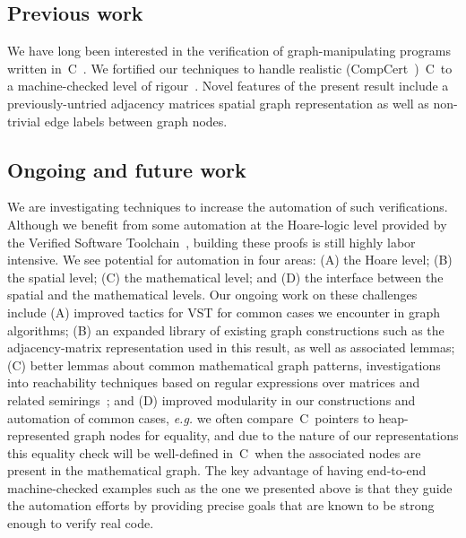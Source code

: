 \subsection{Previous work} We have long been interested in
the verification of graph-manipulating programs written in~C~\cite{hobor:ramification}.
We fortified our techniques to handle realistic (CompCert~\cite{leroy:compcert})~C~to a machine-checked level of rigour~\cite{DBLP:journals/pacmpl/WangCMH19}.  Novel features of the present result include a previously-untried adjacency matrices spatial graph representation as well as non-trivial edge labels between graph nodes. %

\subsection{Ongoing and future work}
{\color{red}We are investigating techniques to increase the automation of such verifications.  Although
we benefit from some automation at the Hoare-logic level provided by the Verified Software
Toolchain~\cite{appel:programlogics}, building these proofs is still highly labor intensive.  We see potential
for automation in four areas: (A) the Hoare level; (B) the spatial level; (C) the mathematical level; and (D) the interface between the spatial and the mathematical levels.  Our ongoing work
on these challenges include (A) improved tactics for VST for common cases we encounter in graph
algorithms; (B) an expanded library of existing graph constructions such as the adjacency-matrix representation used in this result, as well as associated lemmas;
(C) better lemmas about common mathematical graph patterns, investigations into reachability techniques
based on regular expressions over matrices and related semirings~\cite{backhouse,DBLP:journals/jacm/Tarjan81a,dolan2013fun,krishna2017go}; and (D) improved modularity in our constructions and
automation of common cases, \emph{e.g.} we often compare~C~pointers to heap-represented graph
nodes for equality, and due to the nature of our representations this equality check will be
well-defined in~C~when the associated nodes are present in the mathematical graph.  The key
advantage of having end-to-end machine-checked examples such as the one we presented above is
that they guide the automation efforts by providing precise goals that are known to be strong
enough to verify real code.}




